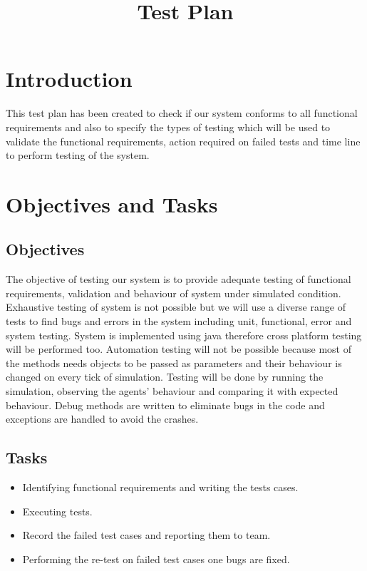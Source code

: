 \documentclass[11pt, oneside]{article}   	%
\title{Test Plan}
\author{}
\begin{document}
\maketitle
\section{Introduction}
This test plan has been created to check if our system conforms to all functional requirements and also to specify the types of testing which will be used to validate the functional requirements, action required on failed tests and time line to perform testing of the system.
\section{Objectives and Tasks}
\subsection{Objectives}
The objective of testing our system is to provide adequate testing of functional requirements, validation and behaviour of system under simulated condition. Exhaustive testing of system is not possible but we will use a diverse range of tests to find bugs and errors in the system including unit, functional, error and system testing. System is implemented using java therefore cross platform testing will be performed too. Automation testing will not be possible because most of the methods needs objects to be passed as parameters and their behaviour is changed on every tick of simulation. Testing will be done by running the simulation, observing the agents' behaviour and comparing it with expected behaviour. Debug methods are written to eliminate bugs in the code and exceptions are handled to avoid the crashes.
\subsection{Tasks}
\begin{itemize}
\item Identifying functional requirements and writing the tests cases.
\item Executing tests.
\item Record the failed test cases and reporting them to team.
\item Performing the re-test on failed test cases one bugs are fixed.
\end{itemize}
\end{document}
